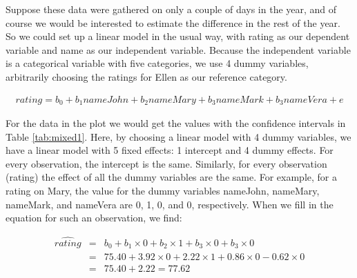 \begin{knitrout}
\color{fgcolor}\begin{kframe}


{\ttfamily\noindent\bfseries{}}

{\ttfamily\noindent\bfseries{}}

{\ttfamily\noindent\bfseries{}}\end{kframe}
\end{knitrout}


Suppose these data were gathered on only a couple of days in the year, and of course we would be interested to estimate the difference in the rest of the year. So we could set up a linear model in the usual way, with rating as our dependent variable and name as our independent variable. Because the independent variable is a categorical variable with five categories, we use 4 dummy variables, arbitrarily choosing the ratings for Ellen as our reference category.

\begin{eqnarray}
rating = b_0 + b_1 nameJohn + b_2 nameMary + b_3 nameMark + b_3 nameVera + e \nonumber
\end{eqnarray}

For the data in the plot we would get the values with the confidence intervals in Table \ref{tab:mixed1}. Here, by choosing a linear model with 4 dummy variables, we have a linear model with 5 fixed effects: 1 intercept and 4 dummy effects. For every observation, the intercept is the same. Similarly, for every observation (rating) the effect of all the dummy variables are the same. For example, for a rating on Mary, the value for the dummy variables nameJohn, nameMary, nameMark, and nameVera are 0, 1, 0, and 0, respectively. When we fill in the equation for such an observation, we find:

\begin{eqnarray}
\hat{rating} &=& b_0 + b_1 \times 0 + b_2 \times 1 + b_3 \times 0 + b_3 \times 0  \nonumber\\
              &=& 75.40 + 3.92 \times 0 + 2.22 \times 1 + 0.86 \times 0  -0.62 \times 0  \nonumber\\
              &=& 75.40 + 2.22 = 77.62
\end{eqnarray}

